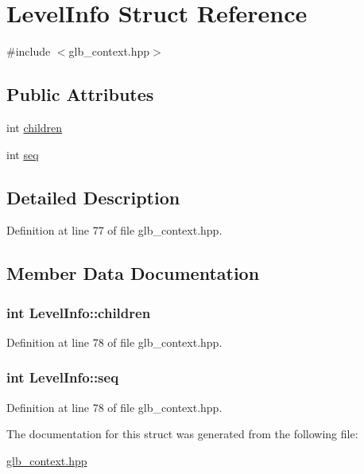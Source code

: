 \hypertarget{struct_level_info}{
\section{LevelInfo Struct Reference}
\label{struct_level_info}
}


{\ttfamily \#include $<$glb\_\-context.hpp$>$}\subsection*{Public Attributes}
\begin{DoxyCompactItemize}
\item 
int \hyperlink{struct_level_info_a4075d16fee017e346fe1cb0a4e7fac58}{children}
\item 
int \hyperlink{struct_level_info_a3e55e9d1036191b0ccbde5a44a9558ae}{seq}
\end{DoxyCompactItemize}


\subsection{Detailed Description}


Definition at line 77 of file glb\_\-context.hpp.

\subsection{Member Data Documentation}
\hypertarget{struct_level_info_a4075d16fee017e346fe1cb0a4e7fac58}{
\subsubsection[{children}]{\setlength{\rightskip}{0pt plus 5cm}int {\bf LevelInfo::children}}}
\label{struct_level_info_a4075d16fee017e346fe1cb0a4e7fac58}


Definition at line 78 of file glb\_\-context.hpp.\hypertarget{struct_level_info_a3e55e9d1036191b0ccbde5a44a9558ae}{
\subsubsection[{seq}]{\setlength{\rightskip}{0pt plus 5cm}int {\bf LevelInfo::seq}}}
\label{struct_level_info_a3e55e9d1036191b0ccbde5a44a9558ae}


Definition at line 78 of file glb\_\-context.hpp.

The documentation for this struct was generated from the following file:\begin{DoxyCompactItemize}
\item 
\hyperlink{glb__context_8hpp}{glb\_\-context.hpp}\end{DoxyCompactItemize}
